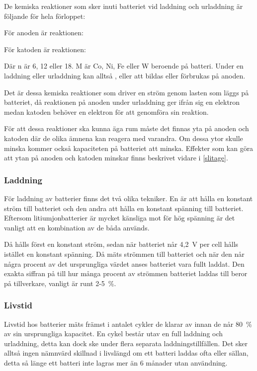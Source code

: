 \documentclass[a4paper,12pt]{article}
\begin{document}

De kemiska reaktioner som sker inuti batteriet vid laddning och urladdning är följande för hela förloppet:

\centerline{}

För anoden är reaktionen:
\\
\centerline{}

För katoden är reaktionen:
\\
\centerline{}

Där n är 6, 12 eller 18. M är Co, Ni, Fe eller W beroende på batteri. Under en laddning eller urladdning kan alltså ,  eller  att bildas eller förbrukas på anoden. \cite{formler} 

Det är dessa kemiska reaktioner som driver en ström genom lasten som läggs på batteriet, då reaktionen på anoden under urladdning ger ifrån sig en elektron medan katoden behöver en elektron för att genomföra sin reaktion.

För att dessa reaktioner ska kunna äga rum måste det finnas yta på anoden och katoden där de olika ämnena kan reagera med varandra. Om dessa ytor skulle minska kommer också kapaciteten på batteriet att minska. Effekter som kan göra att ytan på anoden och katoden minskar finns beskrivet vidare i \ref{slitage}.

\subsubsection{Laddning}
För laddning av batterier finns det två olika tekniker. En är att hålla en konstant ström till batteriet och den andra att hålla en konstant spänning till batteriet. Eftersom litiumjonbatterier är mycket känsliga mot för hög spänning är det vanligt att en kombination av de båda används.

Då hålls först en konstant ström, sedan när batteriet når 4,2~V per cell hålls istället en konstant spänning. Då mäts strömmen till batteriet och när den når några procent av det ursprungliga värdet anses batteriet vara fullt laddat. Den exakta siffran på till hur många procent av strömmen batteriet laddas till beror på tillverkare, vanligt är runt 2-5~\%.

\subsubsection{Livstid}
Livstid hos batterier mäts främst i antalet cykler de klarar av innan de når 80~\% av sin ursprungliga kapacitet. En cykel består utav en full laddning och urladdning, detta kan dock ske under flera separata laddningstillfällen. Det sker alltså ingen nämnvärd skillnad i livslängd om ett batteri laddas ofta eller sällan, detta så länge ett batteri inte lagras mer än 6 månader utan användning.
\end{document}

